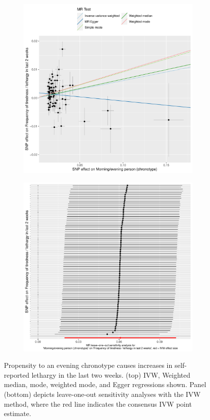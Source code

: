 \documentclass{article}
\begin{document}
\begin{figure}[htbp]
\begin{subfigure}{\linewidth}
\centering
	\includegraphics[width=.8\linewidth]{Figs/Analysis2/Morning_evening_person_(chronotype)_vs_Frequency_of_tiredness___lethargy_in_last_2_weeks.Scatterplots.pdf}
\label{lethargyScatter}
\end{subfigure}
\begin{subfigure}{\linewidth}
\centering
	\includegraphics[width=.8\linewidth,keepaspectratio]{Figs/Analysis2/Morning_evening_person_(chronotype)_vs_Frequency_of_tiredness___lethargy_in_last_2_weeks.LOOplots.pdf}
\label{lethargyLoo}
\end{subfigure}
\caption{Propensity to an evening chronotype causes increases in self-reported lethargy in the last two weeks. (top) IVW, Weighted median, mode, weighted mode, and Egger regressions shown. Panel (bottom) depicts leave-one-out sensitivity analyses with the IVW method, where the red line indicates the consensus IVW point estimate.}
\label{lethargy}
\end{figure}
\end{document}
